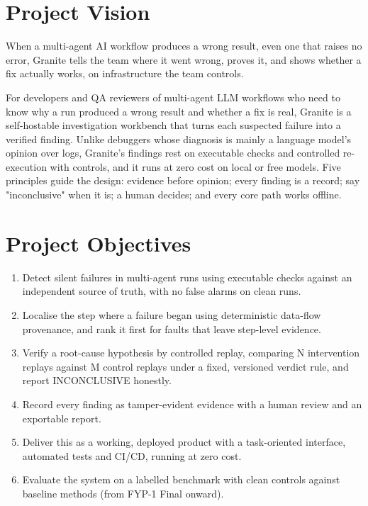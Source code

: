\section{Project Vision}

When a multi-agent AI workflow produces a wrong result, even one that raises no error, Granite tells the team where it went wrong, proves it, and shows whether a fix actually works, on infrastructure the team controls.

For developers and QA reviewers of multi-agent LLM workflows who need to know why a run produced a wrong result and whether a fix is real, Granite is a self-hostable investigation workbench that turns each suspected failure into a verified finding. Unlike debuggers whose diagnosis is mainly a language model's opinion over logs, Granite's findings rest on executable checks and controlled re-execution with controls, and it runs at zero cost on local or free models. Five principles guide the design: evidence before opinion; every finding is a record; say "inconclusive" when it is; a human decides; and every core path works offline.

\section{Project Objectives}

\begin{enumerate}
\item Detect silent failures in multi-agent runs using executable checks against an independent source of truth, with no false alarms on clean runs.
\item Localise the step where a failure began using deterministic data-flow provenance, and rank it first for faults that leave step-level evidence.
\item Verify a root-cause hypothesis by controlled replay, comparing N intervention replays against M control replays under a fixed, versioned verdict rule, and report INCONCLUSIVE honestly.
\item Record every finding as tamper-evident evidence with a human review and an exportable report.
\item Deliver this as a working, deployed product with a task-oriented interface, automated tests and CI/CD, running at zero cost.
\item Evaluate the system on a labelled benchmark with clean controls against baseline methods (from FYP-1 Final onward).
\end{enumerate}

